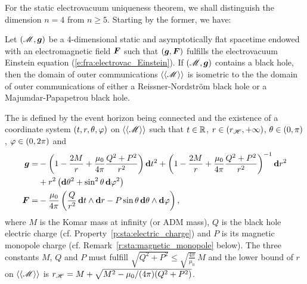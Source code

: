 For the static electrovacuum uniqueness theorem, we shall distinguish
the dimension $n=4$ from $n \geq 5$. Starting by the former, we have:

\begin{prop}[Generalized Israel uniqueness theorem ($\bm{n = 4}$ electrovacuum)
\index{Israel uniqueness theorem!electrovacuum}]
\label{p:sta:Israel_uniq_electrovac_n4}
Let $(\mathscr{M},\bm{g})$ be a 4-dimensional static and asymptotically flat spacetime
endowed with an electromagnetic field $\bm{F}$
such that
$(\bm{g},\bm{F})$ fulfills the electrovacuum Einstein equation (\ref{e:fra:electrovac_Einstein}).
If $(\mathscr{M},\bm{g})$ contains a black hole, then the domain of outer communications $\langle\langle \mathscr{M}\rangle\rangle$ is isometric
to the the domain of outer communications of either a Reissner-Nordström black hole or a Majumdar-Papapetrou black hole.

The  is defined by the event horizon being connected and
the existence of a
coordinate system $(t,r,\theta,\varphi)$ on $\langle\langle \mathscr{M}\rangle\rangle$ such
that $t\in\mathbb{R}$, $r\in (r_{\mathscr{H}},+\infty)$, $\theta \in (0,\pi)$,
$\varphi\in (0, 2\pi)$ and
\begin{subequations}
\label{e:sta:ReiNor_n4}
\begin{align}
    \bm{g}  = & -\left( 1 - \frac{2 M}{r} + \frac{\mu_0}{4\pi} \frac{Q^2 + P^2}{r^2} \right) \mathbf{d} t^2
    + \left( 1 - \frac{2 M}{r} + \frac{\mu_0}{4\pi} \frac{Q^2 + P^2}{r^2} \right) ^{-1} \mathbf{d} r^2
    \nonumber \\
    &  + r^2 \left( \mathbf{d}\theta^2 + \sin^2\theta\, \mathbf{d}\varphi^2 \right) \label{e:sta:g_ReiNor_n4} \\
    \bm{F}  = & - \frac{\mu_0}{4\pi} \left( \frac{Q}{r^2}\,  \mathbf{d} t \wedge \mathbf{d} r
     - P \sin\theta \, \mathbf{d} \theta \wedge\mathbf{d} \varphi \right) , \label{e:sta:F_ReiNor_n4}
\end{align}
\end{subequations}
where $M$ is the Komar mass at infinity
(or ADM mass), $Q$ is the black hole electric charge (cf. Property~\ref{p:sta:electric_charge})
and
$P$ is its magnetic monopole charge (cf. Remark~\ref{r:sta:magnetic_monopole} below).
The three constants $M$, $Q$ and $P$ must fulfill
$\sqrt{Q^2 + P^2} \leq \sqrt{\frac{4\pi}{\mu_0}}\, M$
and the lower bound of $r$ on $\langle\langle \mathscr{M}\rangle\rangle$ is
 $r_{\mathscr{H}} = M + \sqrt{M^2 - \mu_0/(4\pi)(Q^2 + P^2)}$.


\end{prop}
